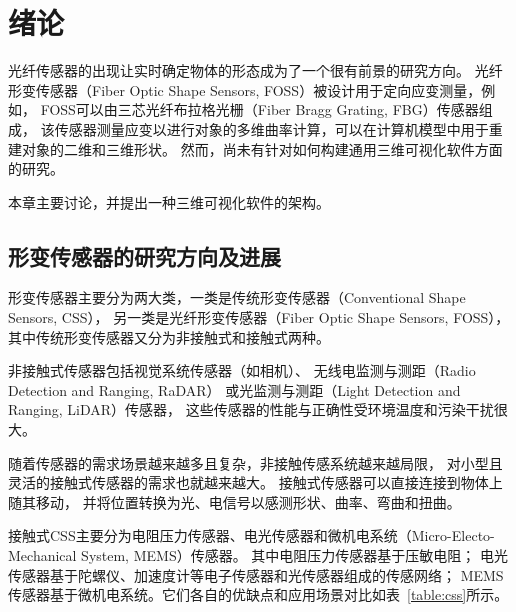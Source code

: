 \clearpage
\setcounter{page}{1}

\section{绪论}
\label{sec:intro}

光纤传感器的出现让实时确定物体的形态成为了一个很有前景的研究方向\cite{recent-dev-in-foss}。
光纤形变传感器（Fiber Optic Shape Sensors, FOSS）被设计用于定向应变测量，例如，
FOSS可以由三芯光纤布拉格光栅（Fiber Bragg Grating, FBG）传感器组成，
该传感器测量应变以进行对象的多维曲率计算，可以在计算机模型中用于重建对象的二维和三维形状。
然而，尚未有针对如何构建通用三维可视化软件方面的研究。

本章主要讨论，并提出一种三维可视化软件的架构。

\subsection{形变传感器的研究方向及进展}
\label{sec:ss}

形变传感器主要分为两大类，一类是传统形变传感器（Conventional Shape Sensors, CSS），
另一类是光纤形变传感器（Fiber Optic Shape Sensors, FOSS）， 
其中传统形变传感器又分为非接触式和接触式两种。

非接触式传感器包括视觉系统传感器（如相机）、
无线电监测与测距（Radio Detection and Ranging, RaDAR）
或光监测与测距（Light Detection and Ranging, LiDAR）传感器，
这些传感器的性能与正确性受环境温度和污染干扰很大。

随着传感器的需求场景越来越多且复杂，非接触传感系统越来越局限，
对小型且灵活的接触式传感器的需求也就越来越大。
接触式传感器可以直接连接到物体上随其移动，
并将位置转换为光、电信号以感测形状、曲率、弯曲和扭曲。

接触式CSS主要分为电阻压力传感器、电光传感器和微机电系统（Micro-Electo-Mechanical System, MEMS）传感器。
其中电阻压力传感器基于压敏电阻；
电光传感器基于陀螺仪、加速度计等电子传感器和光传感器组成的传感网络；
MEMS传感器基于微机电系统。它们各自的优缺点和应用场景对比如表~\ref{table:css}所示。


